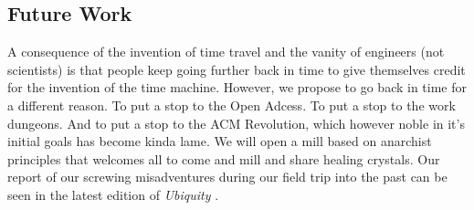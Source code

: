 \subsection{Future Work}
A consequence of the invention of time travel \cite{time-travel} and the vanity
of engineers (not scientists) \cite{sci-shirt} is that people keep going
further back in time to give themselves credit for the invention of the time
machine.
However, we propose to go back in time for a different reason.
To put a stop to the Open Adcess.
To put a stop to the work dungeons.
And to put a stop to the ACM Revolution, which however noble in it's initial
goals has become  kinda lame.
We will open a mill based on anarchist principles that welcomes all to come and
mill and share healing crystals.
Our report of our screwing misadventures during our field trip into the past
can be seen in the latest edition of \textit{Ubiquity} \cite{future-ub}.

